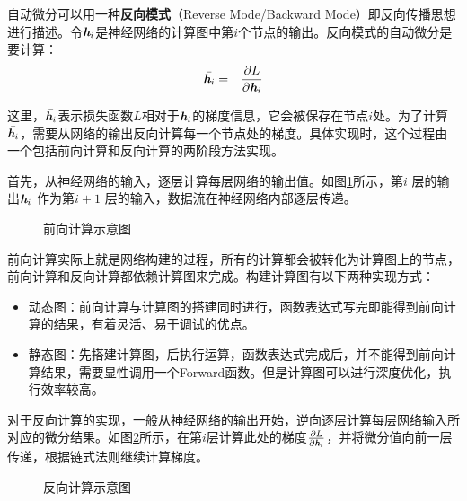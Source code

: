 \parinterval  自动微分可以用一种{\small\sffamily\bfseries{反向模式}}（Reverse Mode/Backward Mode）即反向传播思想进行描述。令${\textbf{\em h}}_i$是神经网络的计算图中第$i$个节点的输出。反向模式的自动微分是要计算：
\begin{eqnarray}
\bar{{\textbf{\em h}}_i} &=& \frac{\partial L}{\partial {\textbf{\em h}}_i} \label{eq:reverse-mode-v}
\end{eqnarray}

\noindent 这里，$\bar{{\textbf{\em h}}_i}$表示损失函数$L$相对于${\textbf{\em h}}_i$的梯度信息，它会被保存在节点$i$处。为了计算$\bar{{\textbf{\em h}}_i}$，需要从网络的输出反向计算每一个节点处的梯度。具体实现时，这个过程由一个包括前向计算和反向计算的两阶段方法实现。

\parinterval 首先，从神经网络的输入，逐层计算每层网络的输出值。如图\ref{fig:9-44}所示，第$ i $ 层的输出$ {\textbf{\em h}}_i $ 作为第$ i+1 $ 层的输入，数据流在神经网络内部逐层传递。

\begin{figure}[htp]
\centering

\caption{前向计算示意图}
\label{fig:9-44}
\end{figure}

\parinterval  前向计算实际上就是网络构建的过程，所有的计算都会被转化为计算图上的节点，前向计算和反向计算都依赖计算图来完成。构建计算图有以下两种实现方式：

\begin{itemize}
\vspace{0.5em}
\item 动态图：前向计算与计算图的搭建同时进行，函数表达式写完即能得到前向计算的结果，有着灵活、易于调试的优点。
\vspace{0.5em}
\item 静态图：先搭建计算图，后执行运算，函数表达式完成后，并不能得到前向计算结果，需要显性调用一个Forward函数。但是计算图可以进行深度优化，执行效率较高。
\vspace{0.5em}
\end{itemize}

\parinterval  对于反向计算的实现，一般从神经网络的输出开始，逆向逐层计算每层网络输入所对应的微分结果。如图\ref{fig:9-45}所示，在第$ i $层计算此处的梯度$ \frac{\partial L}{\partial {\textbf{\em h}}_i} $，并将微分值向前一层传递，根据链式法则继续计算梯度。

\begin{figure}[htp]
\centering

\caption{反向计算示意图}
\label{fig:9-45}
\end{figure}

